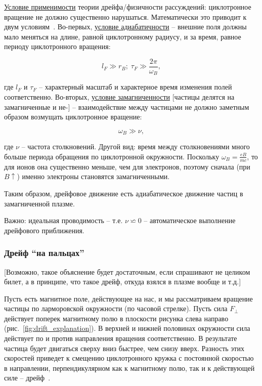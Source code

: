 \documentclass[10pt, a4paper]{article}
\begin{document}
\uline{Условие применимости} теории дрейфа/физичности рассуждений: циклотронное вращение не должно существенно нарушаться. Математически это приводит к двум условиям~\cite{frank}. Во-первых, \uline{условие адиабатичности} -- внешние поля должны мало меняться на длине, равной циклотронному радиусу, и за время, равное периоду циклотронного вращения:

\begin{equation*}
	l_F \gg r_B;\; \tau_F \gg \frac{2\pi}{\omega_B},
\end{equation*}

где $l_F$ и $\tau_F$ -- характерный масштаб и характерное время изменения полей соответственно. Во-вторых, \uline{условие замагниченности} [частицы делятся на замагниченные и не-] -- взаимодействие между частицами не должно заметным образом возмущать циклотронное вращение:

\begin{equation*}
	\omega_B \gg \nu,
\end{equation*}

где $\nu$ -- частота столкновений. Другой вид: время между столкновениями много больше периода обращения по циклотронной окружности. Поскольку $\omega_B = \frac{eB}{mc}$, то для ионов она существенно меньше, чем для электронов, поэтому сначала (при $B\uparrow$) именно электроны становятся замагниченными.

Таким образом, дрейфовое движение есть адиабатическое движение частиц в замагниченной плазме.

Важно: идеальная проводимость -- т.е. $\nu \backsimeq 0$ -- автоматическое выполнение дрейфового приближения.

\subsubsection{Дрейф ``на пальцах''}

[Возможно, такое объяснение будет достаточным, если спрашивают не целиком билет, а в принципе, что такое дрейф, откуда взялся в плазме вообще и т.д.]

Пусть есть магнитное поле, действующее на нас, и мы рассматриваем вращение частицы по ларморовской окружности (по часовой стрелке). Пусть сила $F_\perp$ действует поперек магнитному полю в плоскости рисунка слева направо (рис.~\ref{fig:drift_explanation}). В верхней и нижней половинах окружности сила действует по и против направления вращения соответственно. В результате частица будет двигаться сверху вниз быстрее, чем снизу
вверх. Разность этих скоростей приведет к смещению
циклотронного кружка с постоянной скоростью в направлении, перпендикулярном как к магнитному полю, так и к действующей силе -- дрейф~\cite{frank}. 
\end{document}
